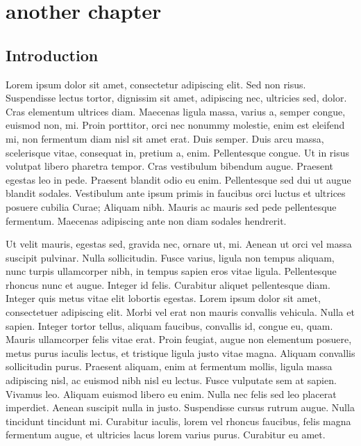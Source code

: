 \ifdefined{}
\else
\setcounter{chapter}{1} %
\dominitoc
\faketableofcontents
\fi

\chapter{another chapter}
\minitoc

\section{Introduction}

Lorem ipsum dolor sit amet, consectetur adipiscing elit. Sed non risus. Suspendisse lectus tortor, dignissim sit amet, adipiscing nec, ultricies sed, dolor. Cras elementum ultrices diam. Maecenas ligula massa, varius a, semper congue, euismod non, mi. Proin porttitor, orci nec nonummy molestie, enim est eleifend mi, non fermentum diam nisl sit amet erat. Duis semper. Duis arcu massa, scelerisque vitae, consequat in, pretium a, enim. Pellentesque congue. Ut in risus volutpat libero pharetra tempor. Cras vestibulum bibendum augue. Praesent egestas leo in pede. Praesent blandit odio eu enim. Pellentesque sed dui ut augue blandit sodales. Vestibulum ante ipsum primis in faucibus orci luctus et ultrices posuere cubilia Curae; Aliquam nibh. Mauris ac mauris sed pede pellentesque fermentum. Maecenas adipiscing ante non diam sodales hendrerit.

Ut velit mauris, egestas sed, gravida nec, ornare ut, mi. Aenean ut orci vel massa suscipit pulvinar. Nulla sollicitudin. Fusce varius, ligula non tempus aliquam, nunc turpis ullamcorper nibh, in tempus sapien eros vitae ligula. Pellentesque rhoncus nunc et augue. Integer id felis. Curabitur aliquet pellentesque diam. Integer quis metus vitae elit lobortis egestas. Lorem ipsum dolor sit amet, consectetuer adipiscing elit. Morbi vel erat non mauris convallis vehicula. Nulla et sapien. Integer tortor tellus, aliquam faucibus, convallis id, congue eu, quam. Mauris ullamcorper felis vitae erat. Proin feugiat, augue non elementum posuere, metus purus iaculis lectus, et tristique ligula justo vitae magna.
Aliquam convallis sollicitudin purus. Praesent aliquam, enim at fermentum mollis, ligula massa adipiscing nisl, ac euismod nibh nisl eu lectus. Fusce vulputate sem at sapien. Vivamus leo. Aliquam euismod libero eu enim. Nulla nec felis sed leo placerat imperdiet. Aenean suscipit nulla in justo. Suspendisse cursus rutrum augue. Nulla tincidunt tincidunt mi. Curabitur iaculis, lorem vel rhoncus faucibus, felis magna fermentum augue, et ultricies lacus lorem varius purus. Curabitur eu amet.



